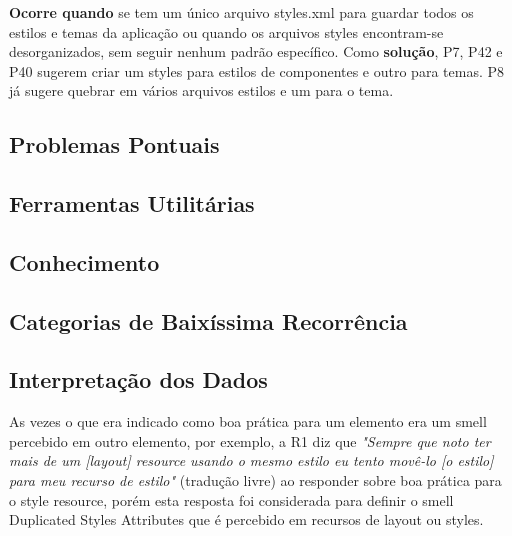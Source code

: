 \textbf{Ocorre quando} se tem um \'unico arquivo styles.xml para guardar todos os estilos e temas da aplica\c{c}\~ao ou quando os arquivos styles encontram-se desorganizados, sem seguir nenhum padr\~ao espec\'ifico. Como \textbf{solu\c{c}\~ao}, P7, P42 e P40 sugerem criar um styles para estilos de componentes e outro para temas. P8 j\'a sugere quebrar em v\'arios arquivos estilos e um para o tema.



\subsection{Problemas Pontuais}

\subsection{Ferramentas Utilit\'arias}

\subsection{Conhecimento}

\subsection{Categorias de Baix\'issima Recorr\^encia}


\subsection{Interpreta\c{c}\~ao dos Dados}

As vezes o que era indicado como boa pr\'atica para um elemento era um smell percebido em outro elemento, por exemplo, a R1 diz que \textit{"Sempre que noto ter mais de um [layout] resource usando o mesmo estilo eu tento mov\^e-lo [o estilo] para meu recurso de estilo"} (tradu\c{c}\~ao livre) ao responder sobre boa pr\'atica para o style resource, por\'em esta resposta foi considerada para definir o smell Duplicated Styles Attributes que \'e percebido em recursos de layout ou styles.



